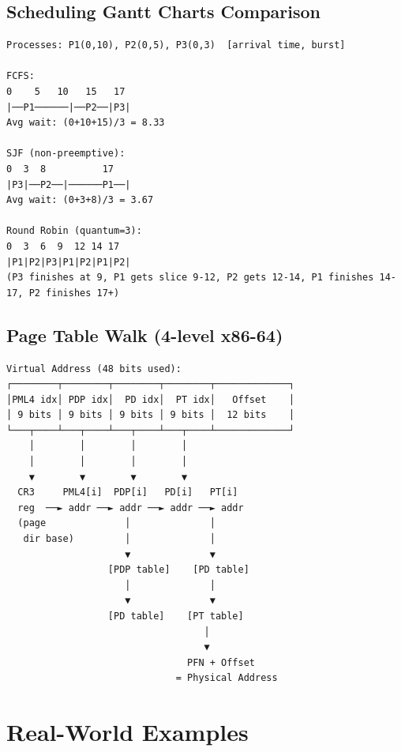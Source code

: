 \documentclass[11pt]{article}
\begin{document}
\subsection{Scheduling Gantt Charts Comparison}\label{scheduling-gantt-charts-comparison}

\setcodelang{}

\begin{verbatim}
Processes: P1(0,10), P2(0,5), P3(0,3)  [arrival time, burst]

FCFS:
0    5   10   15   17
|──P1──────|──P2──|P3|
Avg wait: (0+10+15)/3 = 8.33

SJF (non-preemptive):
0  3  8          17
|P3|──P2──|──────P1──|
Avg wait: (0+3+8)/3 = 3.67

Round Robin (quantum=3):
0  3  6  9  12 14 17
|P1|P2|P3|P1|P2|P1|P2|
(P3 finishes at 9, P1 gets slice 9-12, P2 gets 12-14, P1 finishes 14-17, P2 finishes 17+)
\end{verbatim}

\subsection{Page Table Walk (4-level x86-64)}\label{page-table-walk-4-level-x86-64}

\setcodelang{}

\begin{verbatim}
Virtual Address (48 bits used):
┌────────┬────────┬────────┬────────┬─────────────┐
│PML4 idx│ PDP idx│  PD idx│  PT idx│   Offset    │
│ 9 bits │ 9 bits │ 9 bits │ 9 bits │  12 bits    │
└───┬────┴───┬────┴───┬────┴───┬────┴─────────────┘
    │        │        │        │
    │        │        │        │
    ▼        ▼        ▼        ▼
  CR3     PML4[i]  PDP[i]   PD[i]   PT[i]
  reg  ──► addr ──► addr ──► addr ──► addr
  (page              │              │
   dir base)         │              │
                     ▼              ▼
                  [PDP table]    [PD table]
                     │              │
                     ▼              ▼
                  [PD table]    [PT table]
                                   │
                                   ▼
                                PFN + Offset
                              = Physical Address
\end{verbatim}

\section{Real-World Examples}\label{real-world-examples}
\end{document}
